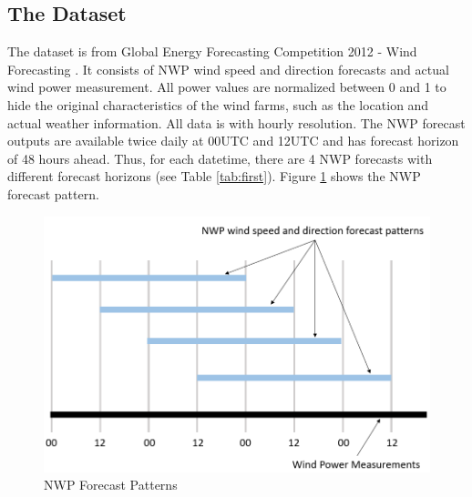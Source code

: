 \documentclass[conference]{IEEEtran}
\begin{document}
\subsection{The Dataset}
The dataset is from Global Energy Forecasting Competition 2012 - Wind Forecasting \cite{HONG2014357}. It consists of NWP wind speed and direction forecasts and actual wind power measurement. All power values are normalized between 0 and 1 to hide the original characteristics of the wind farms, such as the location and actual weather information. All data is with hourly resolution. The NWP forecast outputs are available twice daily at 00UTC and 12UTC and has forecast horizon of 48 hours ahead. Thus, for each datetime, there are 4 NWP forecasts with different forecast horizons (see Table \ref{tab:first}). Figure \ref{fig:pattern} shows the NWP forecast pattern. 
\begin{table}
\caption {Missing Patterns in the First Period}
\begin{center}
\label{tab:first}
\end{center}
\vspace*{-5mm}
\end{table}

\begin{figure}
\centering
\includegraphics[width=0.9\columnwidth]{FIG/pattern}
\caption{NWP Forecast Patterns}
\label{fig:pattern}
\end{figure}
\end{document}
